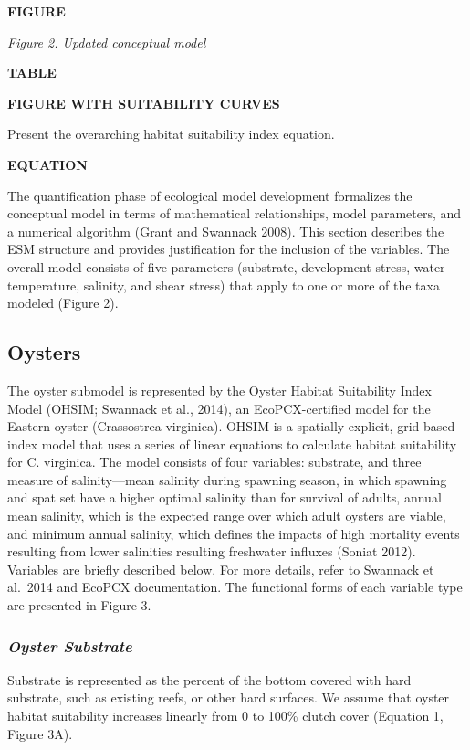 \documentclass[
]{book}
\begin{document}
\textbf{FIGURE}

\emph{Figure 2. Updated conceptual model}

\textbf{TABLE}

\textbf{FIGURE WITH SUITABILITY CURVES}

Present the overarching habitat suitability index equation.

\textbf{EQUATION}

The quantification phase of ecological model development formalizes the conceptual model in terms of mathematical relationships, model parameters, and a numerical algorithm (Grant and Swannack 2008). This section describes the ESM structure and provides justification for the inclusion of the variables. The overall model consists of five parameters (substrate, development stress, water temperature, salinity, and shear stress) that apply to one or more of the taxa modeled (Figure 2).

\hypertarget{oysters}{%
\subsection{Oysters}\label{oysters}}

The oyster submodel is represented by the Oyster Habitat Suitability Index Model (OHSIM; Swannack et al., 2014), an EcoPCX-certified model for the Eastern oyster (Crassostrea virginica). OHSIM is a spatially-explicit, grid-based index model that uses a series of linear equations to calculate habitat suitability for C. virginica. The model consists of four variables: substrate, and three measure of salinity---mean salinity during spawning season, in which spawning and spat set have a higher optimal salinity than for survival of adults, annual mean salinity, which is the expected range over which adult oysters are viable, and minimum annual salinity, which defines the impacts of high mortality events resulting from lower salinities resulting freshwater influxes (Soniat 2012). Variables are briefly described below. For more details, refer to Swannack et al.~2014 and EcoPCX documentation. The functional forms of each variable type are presented in Figure 3.

\hypertarget{oyster-substrate}{%
\subsubsection{\texorpdfstring{\emph{Oyster Substrate}}{Oyster Substrate}}\label{oyster-substrate}}

Substrate is represented as the percent of the bottom covered with hard substrate, such as existing reefs, or other hard surfaces. We assume that oyster habitat suitability increases linearly from 0 to 100\% clutch cover (Equation 1, Figure 3A).
\end{document}
